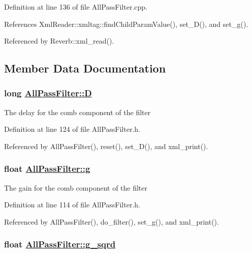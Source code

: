 Definition at line 136 of file All\-Pass\-Filter.cpp.

References Xml\-Reader::xmltag::find\-Child\-Param\-Value(), set\_\-D(), and set\_\-g().

Referenced by Reverb::xml\_\-read().

\subsection{Member Data Documentation}
\hypertarget{classAllPassFilter_r2}{
\subsubsection[D]{\setlength{\rightskip}{0pt plus 5cm}long \hyperlink{classAllPassFilter_r2}{All\-Pass\-Filter::D}}}
\label{classAllPassFilter_r2}


The delay for the comb component of the filter 

Definition at line 124 of file All\-Pass\-Filter.h.

Referenced by All\-Pass\-Filter(), reset(), set\_\-D(), and xml\_\-print().\hypertarget{classAllPassFilter_r0}{
\subsubsection[g]{\setlength{\rightskip}{0pt plus 5cm}float \hyperlink{classAllPassFilter_r0}{All\-Pass\-Filter::g}}}
\label{classAllPassFilter_r0}


The gain for the comb component of the filter 

Definition at line 114 of file All\-Pass\-Filter.h.

Referenced by All\-Pass\-Filter(), do\_\-filter(), set\_\-g(), and xml\_\-print().\hypertarget{classAllPassFilter_r1}{
\subsubsection[g\_\-sqrd]{\setlength{\rightskip}{0pt plus 5cm}float \hyperlink{classAllPassFilter_r1}{All\-Pass\-Filter::g\_\-sqrd}}}
\label{classAllPassFilter_r1}


